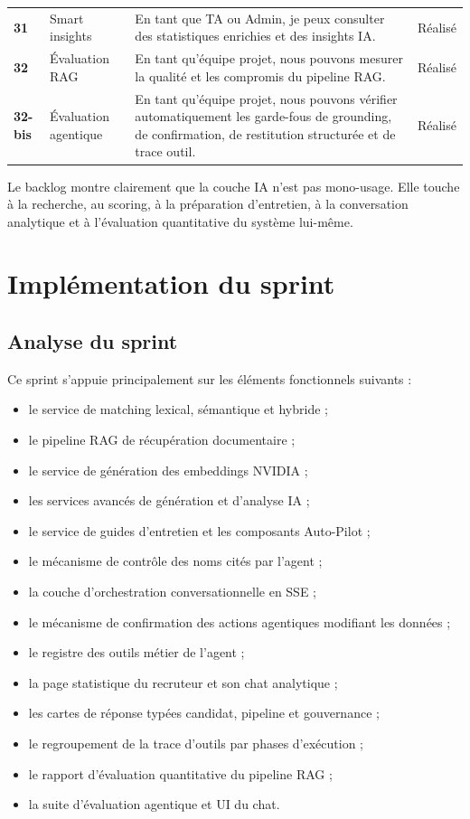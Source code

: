 \begin{table}[H]
\begin{tabularx}{\textwidth}{>{\bfseries}p{1.3cm}p{3.2cm}X>{\raggedright\arraybackslash}p{2cm}}
    31 & Smart insights & En tant que TA ou Admin, je peux consulter des statistiques enrichies et des insights IA. & Réalisé \\
    32 & Évaluation RAG & En tant qu'équipe projet, nous pouvons mesurer la qualité et les compromis du pipeline RAG. & Réalisé \\
    32-bis & Évaluation agentique & En tant qu'équipe projet, nous pouvons vérifier automatiquement les garde-fous de grounding, de confirmation, de restitution structurée et de trace outil. & Réalisé \\
    \bottomrule
  \end{tabularx}
\end{table}

Le backlog montre clairement que la couche IA n'est pas mono-usage. Elle touche à la recherche, au scoring, à la préparation d'entretien, à la conversation analytique et à l'évaluation quantitative du système lui-même.

\section{Implémentation du sprint}

\subsection{Analyse du sprint}
Ce sprint s'appuie principalement sur les éléments fonctionnels suivants :
\begin{itemize}
  \item le service de matching lexical, sémantique et hybride ;
  \item le pipeline RAG de récupération documentaire ;
  \item le service de génération des embeddings NVIDIA ;
  \item les services avancés de génération et d'analyse IA ;
  \item le service de guides d'entretien et les composants Auto-Pilot ;
  \item le mécanisme de contrôle des noms cités par l'agent ;
  \item la couche d'orchestration conversationnelle en SSE ;
  \item le mécanisme de confirmation des actions agentiques modifiant les données ;
  \item le registre des outils métier de l'agent ;
  \item la page statistique du recruteur et son chat analytique ;
  \item les cartes de réponse typées candidat, pipeline et gouvernance ;
  \item le regroupement de la trace d'outils par phases d'exécution ;
  \item le rapport d'évaluation quantitative du pipeline RAG ;
  \item la suite d'évaluation agentique et UI du chat.
\end{itemize}

